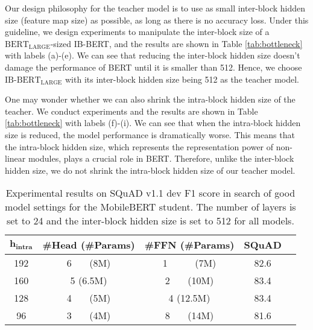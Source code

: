 \documentclass[11pt,a4paper]{article}
\begin{document}
Our design philosophy for the teacher model is to use as small inter-block hidden size (feature map size) as possible, as long as there is no accuracy loss. Under this guideline, we design experiments to manipulate the inter-block size of a $\text{BERT}_\text{LARGE}$-sized IB-BERT, and the results are shown in Table \ref{tab:bottleneck} with labels (a)-(e).
We can see that reducing the inter-block hidden size doesn't damage the performance of BERT until it is smaller than 512. Hence, we choose $\text{IB-BERT}_\text{LARGE}$ with its inter-block hidden size being 512 as the teacher model.


One may wonder whether we can also shrink the intra-block hidden size of the teacher. We conduct experiments and the results are shown in Table \ref{tab:bottleneck} with labels (f)-(i).  We can see that when the intra-block hidden size is reduced, the model performance is dramatically worse. This means that the intra-block hidden size, which represents the representation power of non-linear modules, plays a crucial role in BERT. 
Therefore, unlike the inter-block hidden size, we do not shrink the intra-block hidden size of our teacher model.






\setlength{\tabcolsep}{2pt}
\begin{table}[t]
    \centering
    \small
	\begin{tabular}{c c c c c}
		\hline
		$\mathbf{h_{intra}}$  & \textbf{\#Head (\#Params)} & \textbf{\#FFN (\#Params)} & \textbf{SQuAD}\\
		\hline
		192 & 6 \ \ \ (8M) & 1 \ \ \ \ \ (7M)  & 82.6 \\
		160 & 5 (6.5M) & 2 \ \ \ (10M)  & 83.4 \\			
		128 & 4 \ \ \ (5M) & 4 (12.5M)  & 83.4 \\
		96 & 3 \ \ \ (4M) & 8 \ \ \ (14M)  & 81.6 \\
		\hline
\end{tabular}
	\caption{Experimental results on SQuAD v1.1 dev F1 score in search of good model settings for the MobileBERT student. The number of layers is set to 24 and the inter-block hidden size is set to 512 for all models. }
	\label{tab:bottleneck2}
\end{table}
\setlength{\tabcolsep}{6pt}

\setlength{\tabcolsep}{2pt}
\end{document}
